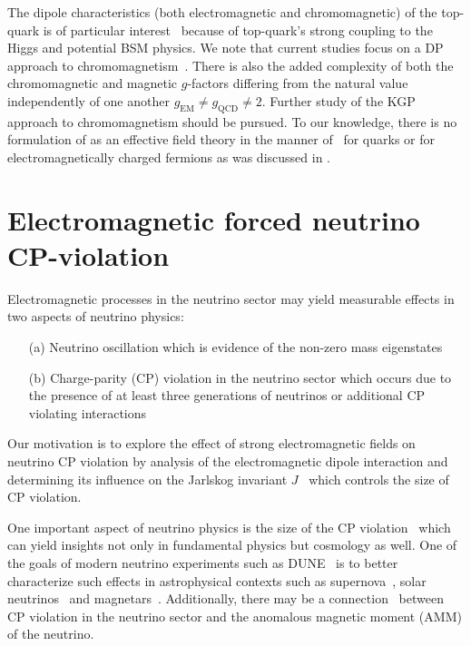 The dipole characteristics (both electromagnetic and chromomagnetic) of the top-quark is of particular interest~\citep{Labun:2012fg,Vryonidou:2018eyv} because of top-quark's strong coupling to the Higgs and potential BSM physics. We note that current studies focus on a DP approach to chromomagnetism~\citep{Zhang:2010dr,Zhang:2012muc,BuarqueFranzosi:2015jrv}. There is also the added complexity of both the chromomagnetic and magnetic $g$-factors differing from the natural value independently of one another $g_\mathrm{EM}\neq g_\mathrm{QCD}\neq2$. Further study of the KGP approach to chromomagnetism should be pursued. To our knowledge, there is no formulation of  as an effective field theory in the manner of~\cite{Fleming:2000ib,Bauer:2000yr} for quarks or for electromagnetically charged fermions as was discussed in .


\section{Electromagnetic forced neutrino CP-violation}
\label{sec:nucp}
Electromagnetic processes in the neutrino sector may yield measurable effects in two aspects of neutrino physics: 
\begin{itemize}
    \item[(a)] Neutrino oscillation which is evidence of the non-zero mass eigenstates
    \item[(b)] Charge-parity (CP) violation in the neutrino sector which occurs due to the presence of at least three generations of neutrinos or additional CP violating interactions
\end{itemize}

Our motivation is to explore the effect of strong electromagnetic fields on neutrino CP violation by analysis of the electromagnetic dipole interaction and determining its influence on the Jarlskog invariant $J$~\citep{Jarlskog:1985ht,Jarlskog:1985cw,Jarlskog:2004be} which controls the size of CP violation.

One important aspect of neutrino physics is the size of the CP violation~\citep{Xing:2000ik,giunti2007fundamentals,Huber:2022lpm} which can yield insights not only in fundamental physics but cosmology as well. One of the goals of modern neutrino experiments such as DUNE~\cite{DUNE:2020jqi} is to better characterize such effects in astrophysical contexts such as supernova~\citep{DUNE:2020zfm,SajjadAthar:2021prg}, solar neutrinos~\citep{Akhmedov:2022txm} and magnetars~\citep{Lichkunov:2020zzx}. Additionally, there may be a connection~\citep{Pehlivan:2014zua,Balaji:2019fxd,Balaji:2020oig} between CP violation in the neutrino sector and the anomalous magnetic moment (AMM) of the neutrino.


